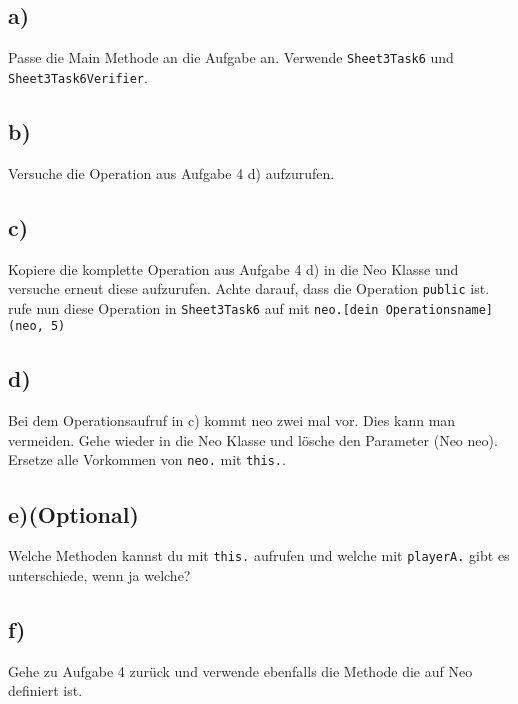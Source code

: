 \subsection*{a)}
	Passe die Main Methode an die Aufgabe an. Verwende \lstinline{Sheet3Task6} und \lstinline{Sheet3Task6Verifier}.
\subsection*{b)}
	Versuche die Operation aus Aufgabe 4 d) aufzurufen.
\subsection*{c)}
	Kopiere die komplette Operation aus Aufgabe 4 d) in die Neo Klasse und versuche erneut diese aufzurufen. Achte darauf, dass die Operation \lstinline{public} ist.
	rufe nun diese Operation in \lstinline{Sheet3Task6} auf mit \lstinline{neo.[dein Operationsname](neo, 5)}
\subsection*{d)} Bei dem Operationsaufruf in c) kommt neo zwei mal vor. Dies kann man vermeiden. Gehe wieder in die Neo Klasse und lösche den Parameter (Neo neo). Ersetze alle Vorkommen von \lstinline{neo.} mit \lstinline{this.}.
\subsection*{e)(Optional)}Welche Methoden kannst du mit \lstinline{this.} aufrufen und welche mit \lstinline{playerA.} gibt es unterschiede, wenn ja welche?
\subsection*{f)}Gehe zu Aufgabe 4 zurück und verwende ebenfalls die Methode die auf Neo definiert ist.